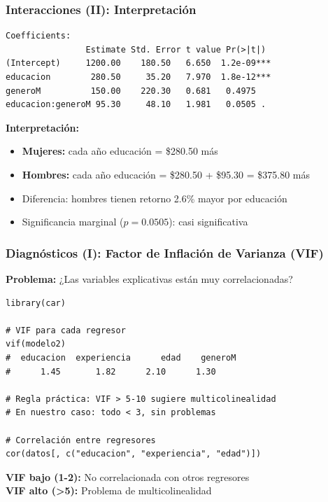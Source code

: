 \documentclass[aspectratio=169,11pt]{beamer}
\begin{document}
\begin{frame}[fragile]
  \frametitle{Interacciones (II): Interpretación}

  \tiny
  \begin{lstlisting}
Coefficients:
                Estimate Std. Error t value Pr(>|t|)
(Intercept)     1200.00    180.50   6.650  1.2e-09***
educacion        280.50     35.20   7.970  1.8e-12***
generoM          150.00    220.30   0.681   0.4975
educacion:generoM 95.30     48.10   1.981   0.0505 .
  \end{lstlisting}

  \small
  \textbf{Interpretación:}
  \begin{itemize}
    \item \textbf{Mujeres:} cada año educación = \$280.50 más
    \item \textbf{Hombres:} cada año educación = \$280.50 + \$95.30 = \$375.80 más
    \item Diferencia: hombres tienen retorno 2.6\% mayor por educación
    \item Significancia marginal ($p=0.0505$): casi significativa
  \end{itemize}
\end{frame}

\begin{frame}[fragile]
  \frametitle{Diagnósticos (I): Factor de Inflación de Varianza (VIF)}

  \textbf{Problema:} ¿Las variables explicativas están muy correlacionadas?

  \begin{lstlisting}
library(car)

# VIF para cada regresor
vif(modelo2)
#  educacion  experiencia      edad    generoM
#      1.45       1.82      2.10      1.30

# Regla práctica: VIF > 5-10 sugiere multicolinealidad
# En nuestro caso: todo < 3, sin problemas

# Correlación entre regresores
cor(datos[, c("educacion", "experiencia", "edad")])
  \end{lstlisting}

  \small
  \textbf{VIF bajo (1-2):} No correlacionada con otros regresores\\
  \textbf{VIF alto (>5):} Problema de multicolinealidad
\end{frame}
\end{document}

